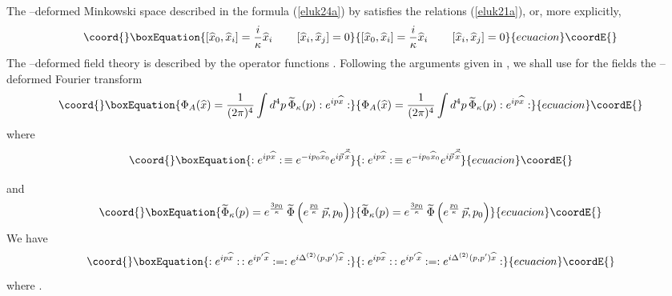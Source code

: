 \documentclass[a4paper,12pt]{article}
\begin{document}
The \myHighlight{$\kappa$}\coordHE{}--deformed Minkowski space described in the formula
 (\ref{eluk24a}) by \coordHE{} satisfies the relations (\ref{eluk21a}), or, more
 explicitly,
\begin{equation}\coord{}\boxEquation{\label{eluk25}
  \left[ \widehat{x}_{0},
  \widehat{x}_{i}\right] = {i\over \kappa}
  \widehat{x}_{i}
   \qquad
  \left[ \widehat{x}_{i},
  \widehat{x}_{j}\right] = 0
}{\left[ \widehat{x}_{0},
  \widehat{x}_{i}\right] = {i\over \kappa}
  \widehat{x}_{i}
   \qquad
  \left[ \widehat{x}_{i},
  \widehat{x}_{j}\right] = 0
}{ecuacion}\coordE{}\end{equation}
The \myHighlight{$\kappa$}\coordHE{}--deformed field theory is described by the operator
functions \coordHE{}. Following the arguments given
in \cite{rluk17},\cite{rluk14} we shall use for the fields
\coordHE{} the \myHighlight{$\kappa$}\coordHE{}--deformed  Fourier transform
\begin{equation}\coord{}\boxEquation{\label{eluk26}
\Phi_{A}(\widehat{x}) =
{1\over (2\pi)^{4}} \int d^{4} p \,
\widetilde{\Phi}_{\kappa}(p) :
e^{ip\widehat{x}}:
}{\Phi_{A}(\widehat{x}) =
{1\over (2\pi)^{4}} \int d^{4} p \,
\widetilde{\Phi}_{\kappa}(p) :
e^{ip\widehat{x}}:
}{ecuacion}\coordE{}\end{equation}
where
\begin{equation}\coord{}\boxEquation{\label{eluk27}
:e^{ip\widehat{x}}: \, \equiv
e^{- ip_{0}\widehat{x}_{0}}
e^{i\vec{p}\,  \vec{\widehat{x}} }
}{:e^{ip\widehat{x}}: \, \equiv
e^{- ip_{0}\widehat{x}_{0}}
e^{i\vec{p}\,  \vec{\widehat{x}} }
}{ecuacion}\coordE{}\end{equation}

and
\begin{equation}\coord{}\boxEquation{\label{eluk28}
\widetilde{\Phi}_{\kappa}(p) =
e^{ {3p_{0} \over \kappa}}\,
\widetilde{\Phi}\left( e^{{p_{0}\over \kappa}} \, \vec{p},p_{0}
\right)
}{\widetilde{\Phi}_{\kappa}(p) =
e^{ {3p_{0} \over \kappa}}\,
\widetilde{\Phi}\left( e^{{p_{0}\over \kappa}} \, \vec{p},p_{0}
\right)
}{ecuacion}\coordE{}\end{equation}
We have
\begin{equation}\coord{}\boxEquation{\label{eluk29}
:e^{ip\widehat{x}}: \,
:e^{ip^{\prime}\widehat{x}}:
 = :e^{i\Delta^{(2)}(p,p^{\prime})\widehat{x}}:
}{:e^{ip\widehat{x}}: \,
:e^{ip^{\prime}\widehat{x}}:
 = :e^{i\Delta^{(2)}(p,p^{\prime})\widehat{x}}:
}{ecuacion}\coordE{}\end{equation}
where \coordHE{}.
\end{document}
